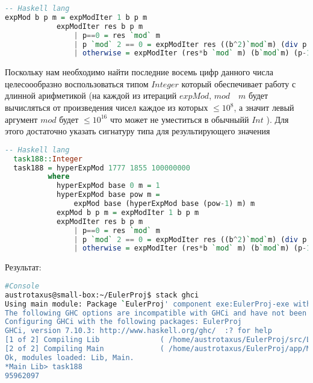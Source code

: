 \documentclass[11pt,a4paper]{article}
\begin{document}
\begin{lstlisting}[language=Haskell]
-- Haskell lang
expMod b p m = expModIter 1 b p m
            expModIter res b p m
                | p==0 = res `mod` m
                | p `mod` 2 == 0 = expModIter res ((b^2)`mod`m) (div p 2) m
                | otherwise = expModIter (res*b `mod` m) (b`mod`m) (p-1) m
\end{lstlisting}

Поскольку нам необходимо найти последние восемь цифр данного числа целесоообразно воспользоваться типом $Integer$ который обеспечивает работу с длинной арифметикой (на каждой из итераций $expMod$, $mod \quad m$ будет вычисляться от произведения чисел каждое из которых $\le  10^8$, а значит левый аргумент $mod$ будет $\le  10^{16}$ что может не уместиться в обычныйй $Int$ ). Для этого достаточно указать сигнатуру типа для результирующего значения
\begin{lstlisting}[language=Haskell]
  -- Haskell lang
  task188::Integer
  task188 = hyperExpMod 1777 1855 100000000
          where
            hyperExpMod base 0 m = 1
            hyperExpMod base pow m =
                expMod base (hyperExpMod base (pow-1) m) m
            expMod b p m = expModIter 1 b p m
            expModIter res b p m
                | p==0 = res `mod` m
                | p `mod` 2 == 0 = expModIter res ((b^2)`mod`m) (div p 2) m
                | otherwise = expModIter (res*b `mod` m) (b`mod`m) (p-1) m

\end{lstlisting}
Результат:
\begin{lstlisting}[language=Bash]
#Console
austrotaxus@small-box:~/EulerProj$ stack ghci
Using main module: Package `EulerProj' component exe:EulerProj-exe with main-is file: /home/austrotaxus/EulerProj/app/Main.hs
The following GHC options are incompatible with GHCi and have not been passed to it: -threaded
Configuring GHCi with the following packages: EulerProj
GHCi, version 7.10.3: http://www.haskell.org/ghc/  :? for help
[1 of 2] Compiling Lib              ( /home/austrotaxus/EulerProj/src/Lib.hs, interpreted )
[2 of 2] Compiling Main             ( /home/austrotaxus/EulerProj/app/Main.hs, interpreted )
Ok, modules loaded: Lib, Main. 
*Main Lib> task188
95962097
\end{lstlisting}
\end{document}
